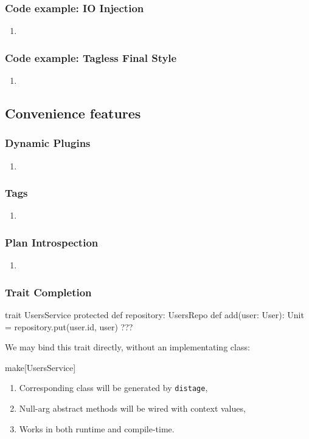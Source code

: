 \documentclass[usenames,dvipsnames]{beamer}
\newcommand{\distage}{\texttt{distage}\xspace}
\begin{document}
\begin{frame}
\frametitle{Code example: IO Injection}
\begin{enumerate}
\item 
\end{enumerate}
\end{frame}

\begin{frame}
\frametitle{Code example: Tagless Final Style}
\begin{enumerate}
\item 
\end{enumerate}
\end{frame}

\subsection{Convenience features}

\begin{frame}
\frametitle{Dynamic Plugins}
\begin{enumerate}
\item 
\end{enumerate}
\end{frame}

\begin{frame}
\frametitle{Tags}
\begin{enumerate}
\item 
\end{enumerate}
\end{frame}

\begin{frame}
\frametitle{Plan Introspection}
\begin{enumerate}
\item 
\end{enumerate}
\end{frame}

\begin{frame}[fragile]
\frametitle{Trait Completion}
\begin{scalacode}
trait UsersService {
  protected def repository: UsersRepo
  def add(user: User): Unit = { 
    repository.put(user.id, user)
    ???
  }
}
\end{scalacode}
We may bind this trait directly, without an implementating class:

\begin{scalacode}
make[UsersService]
\end{scalacode}

\begin{enumerate}
\item Corresponding class will be generated by \distage,
\item Null-arg abstract methods will be wired with context values,
\item Works in both runtime and compile-time.
\end{enumerate}
\end{frame}
\end{document}
